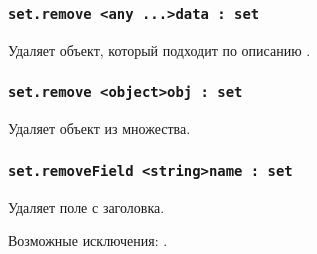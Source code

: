 \subsubsection{\lstinline|set.remove <any ...>data : set|}

Удаляет объект, который подходит по описанию .

\subsubsection{\lstinline|set.remove <object>obj : set|}

Удаляет объект  из множества.

\subsubsection{\lstinline|set.removeField <string>name : set|}

Удаляет поле  с заголовка.

Возможные исключения: .

